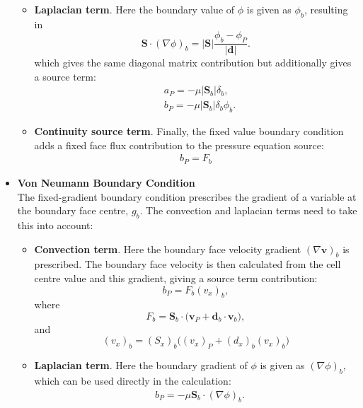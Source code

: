 \documentclass[final,3p,times,twocolumn]{elsarticle}
\begin{document}
\begin{itemize}
\begin{itemize}
            \item \textbf{Laplacian term}. Here the boundary value of $\phi$ is given as $\phi_b$, resulting in
            \begin{equation}
                \label{eqn:laplac_bc_SgradPhi}
                \mathbf{S} \cdot (\nabla \phi)_b = |\mathbf{S}| \frac{\phi_b - \phi_P}{|\mathbf{d}|}.
            \end{equation}
            which gives the same diagonal matrix contribution but additionally gives a source term: 
            \begin{align}
                \label{eqn:lapl_bc_matrix}
                &a_P = - \mu |\mathbf{S}_b| \delta_b , \\
                &b_P = - \mu |\mathbf{S}_b| \delta_b \phi_b.
            \end{align}
            \item \textbf{Continuity source term}. Finally, the fixed value boundary condition adds a fixed face flux contribution to the pressure equation source: 
            \begin{align}
                \label{eqn:conv_matrix}
                b_P = F_b
            \end{align}
        \end{itemize}
    \item \textbf{Von Neumann Boundary Condition} \\
    The fixed-gradient boundary condition prescribes the gradient of a variable at the boundary face centre, $g_b$. The convection and laplacian terms need to take this into account:
    \begin{itemize}
            \item \textbf{Convection term}. Here the boundary face velocity gradient $(\nabla \mathbf{v})_b$ is prescribed. The boundary face velocity is then calculated from the cell centre value and this gradient, giving a source term contribution:
            \begin{equation}
                \label{eqn:neu_bc_conv}
                b_P = F_b (v_x)_b ,
            \end{equation}
            where
            \begin{equation}
                F_b = \mathbf{S}_b \cdot \bigl(\mathbf{v}_P + \mathbf{d}_b \cdot \mathbf{v}_b \bigr) ,
            \end{equation}
            and
            \begin{equation}
                (v_x)_b = (S_x)_b \bigl((v_x)_P + (d_x)_b (v_x)_b \bigr)
            \end{equation}

            \item \textbf{Laplacian term}. Here the boundary gradient of $\phi$ is given as $(\nabla \phi)_b$, which can be used directly in the calculation:
            \begin{align}
                \label{eqn:lapl_bc_matrix}
                &b_P = - \mu \mathbf{S}_b \cdot (\nabla \phi)_b.
            \end{align}
        \end{itemize}
\end{itemize}
\end{document}
